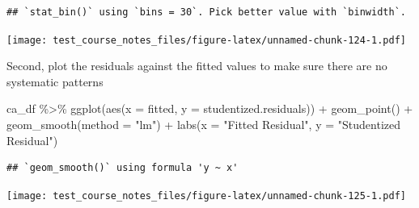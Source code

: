 \documentclass[
]{book}
\newenvironment{Shaded}{\begin{snugshade}}{\end{snugshade}}
\newcommand{\AttributeTok}[1]{\textcolor[rgb]{0.77,0.63,0.00}{#1}}
\newcommand{\ConstantTok}[1]{\textcolor[rgb]{0.00,0.00,0.00}{#1}}
\newcommand{\DecValTok}[1]{\textcolor[rgb]{0.00,0.00,0.81}{#1}}
\newcommand{\FunctionTok}[1]{\textcolor[rgb]{0.00,0.00,0.00}{#1}}
\newcommand{\NormalTok}[1]{#1}
\newcommand{\SpecialCharTok}[1]{\textcolor[rgb]{0.00,0.00,0.00}{#1}}
\newcommand{\StringTok}[1]{\textcolor[rgb]{0.31,0.60,0.02}{#1}}
\begin{document}
\begin{Shaded}
\end{Shaded}

\begin{verbatim}
## `stat_bin()` using `bins = 30`. Pick better value with `binwidth`.
\end{verbatim}

\texttt{[image: test\_course\_notes\_files/figure-latex/unnamed-chunk-124-1.pdf]}

Second, plot the residuals against the fitted values to make sure there are no systematic patterns

\begin{Shaded}
\begin{Highlighting}[]
\NormalTok{ca\_df }\SpecialCharTok{\%\textgreater{}\%} 
  \FunctionTok{ggplot}\NormalTok{(}\FunctionTok{aes}\NormalTok{(}\AttributeTok{x =}\NormalTok{ fitted, }\AttributeTok{y =}\NormalTok{ studentized.residuals)) }\SpecialCharTok{+}
  \FunctionTok{geom\_point}\NormalTok{() }\SpecialCharTok{+}
  \FunctionTok{geom\_smooth}\NormalTok{(}\AttributeTok{method =} \StringTok{"lm"}\NormalTok{) }\SpecialCharTok{+}
  \FunctionTok{labs}\NormalTok{(}\AttributeTok{x =} \StringTok{"Fitted Residual"}\NormalTok{,}
       \AttributeTok{y =} \StringTok{"Studentized Residual"}\NormalTok{)}
\end{Highlighting}
\end{Shaded}

\begin{verbatim}
## `geom_smooth()` using formula 'y ~ x'
\end{verbatim}

\texttt{[image: test\_course\_notes\_files/figure-latex/unnamed-chunk-125-1.pdf]}
\end{document}
